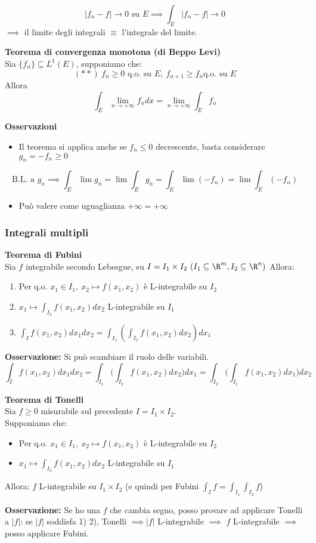 \[|f_n-f|\to 0\text{ su }E\implies \int_{E}^{} |f_n-f|\to 0\]
$\implies$ il limite degli integrali $\equiv$ l'integrale del limite.
\begin{tcolorbox}
	\textbf{Teorema di convergenza monotona (di Beppo Levi)}
	\\Sia $\{f_n\} \subseteq L^1(E)$, supponiamo che:
	\[(* *)\ f_n\ge 0\text{ q.o. su }E,\ f_{n+1}\ge f_n\text{q.o. su }E\]
	Allora
	\[\int_{E}^{} \lim_{n \to +\infty} f_ndx=\lim_{n \to +\infty} \int_{E}^{} f_n\]  
\end{tcolorbox}
\textbf{Osservazioni} 
\begin{itemize}
	\item Il teorema si applica anche se $f_n\le 0$ decrescente, basta considerare $g_n=-f_n\ge 0$
\end{itemize}
\[\text{B.L. a }g_n\implies \int_{E}^{} \lim g_n=\lim\int_{E}^{}g_n=\int_{E}^{} \lim(-f_n)=\lim \int_{E}^{} (-f_n)\]
\begin{itemize}
	\item Può valere come uguaglianza $+\infty=+\infty$
\end{itemize}
\subsubsection{Integrali multipli}
\begin{tcolorbox}
	\textbf{Teorema di Fubini} 
	\\Sia $f$ integrabile secondo Lebesgue, su $I=I_1\times I_2\ (I_1\subseteq  \R^m, I_2\subseteq\R^n)$
	Allora:
	\begin{enumerate}
		\item Per q.o. $x_1\in I_1,\ x_2\mapsto f(x_1,x_2)$ è L-integrabile su $I_2$
		\item $x_1\mapsto \int_{I_2}^{} f(x_1,x_2)dx_2$ L-integrabile su $I_1$
		\item $\int_{I}^{} f(x_1,x_2)dx_1dx_2=\int_{I_1}^{} ( \int_{I_2}^{} f(x_1,x_2)dx_2)dx_1$  
	\end{enumerate}
\end{tcolorbox}
\textbf{Osservazione:} Si può scambiare il ruolo delle variabili.
\[\int_{I}^{} f(x_1,x_2)dx_1dx_2=\int_{I_1}^{} \bigg(\int_{I_2}^{} f(x_1,x_2)dx_2\bigg)dx_1=\int_{I_2}^{} \bigg(\int_{I_1}^{} f(x_1,x_2)dx_1\bigg)dx_2\]
\begin{tcolorbox}
	\textbf{Teorema di Tonelli} 
	\\Sia $f\ge 0$ misurabile sul precedente $I=I_1\times I_2$.
	\\Supponiamo che:
	\begin{itemize}	
		\item Per q.o. $x_1\in I_1,\ x_2\mapsto f(x_1,x_2)$ è L-integrabile su $I_2$
		\item $x_1\mapsto \int_{I_2}^{} f(x_1,x_2)dx_2$ L-integrabile su $I_1$
	\end{itemize}
	Allora: $f$ L-integrabile su $I_1\times I_2$ (e quindi per Fubini $\int_{I}^{} f=\int_{I_1}^{} \int_{I_2}^{} f$)   
\end{tcolorbox}
\textbf{Osservazione:} Se ho una $f$ che cambia segno, posso provare ad applicare Tonelli a $|f|$: se $|f|$ soddisfa 1) 2), Tonelli $\implies |f|$ L-integrabile $\implies$ $f$ L-integrabile $\implies$ posso applicare Fubini. 
